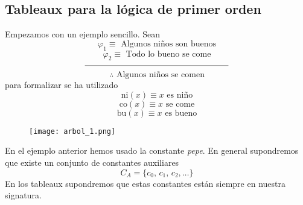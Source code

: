 \subsection{Tableaux para la lógica de primer orden}
Empezamos con un ejemplo sencillo. Sean 
\[ \varphi_1 \equiv \mbox{ Algunos niños son buenos} \]
\[ \varphi_2 \equiv \mbox{ Todo lo bueno se come} \]
\[ \rule{60mm}{0.1mm} \]
\[ \therefore \mbox{ Algunos niños se comen} \]
para formalizar se ha utilizado 
\[ \mbox{ni}(x) \equiv x \mbox{ es niño} \]
\[ \mbox{co}(x) \equiv x \mbox{ se come} \]
\[ \mbox{bu}(x) \equiv x \mbox{ es bueno} \]

\begin{figure}[h]
\centering
\texttt{[image: arbol\_1.png]}
\end{figure}

En el ejemplo anterior hemos usado la constante \textit{pepe}. En general supondremos que existe un conjunto de constantes auxiliares 
\[ C_A= \{c_0,  \, c_1, \, c_2, \ldots \} \]
En los tableaux supondremos que estas constantes están siempre en nuestra signatura.  

